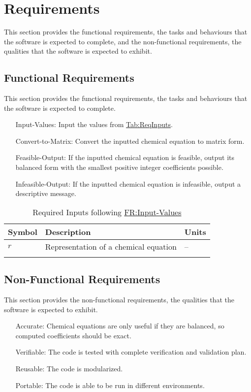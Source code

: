 \documentclass[12pt]{article}
\begin{document}
\section{Requirements}
\label{Sec:Requirements}
This section provides the functional requirements, the tasks and behaviours that the software is expected to complete, and the non-functional requirements, the qualities that the software is expected to exhibit.

\subsection{Functional Requirements}
\label{Sec:FRs}
This section provides the functional requirements, the tasks and behaviours that the software is expected to complete.

\begin{itemize}
\item[Input-Values:\phantomsection\label{inputValues}]{Input the values from \hyperref[Table:ReqInputs]{Tab:ReqInputs}.}
\item[Convert-to-Matrix:\phantomsection\label{convertMatrix}]{Convert the inputted chemical equation to matrix form.}
\item[Feasible-Output:\phantomsection\label{feasOut}]{If the inputted chemical equation is feasible, output its balanced form with the smallest positive integer coefficients possible.}
\item[Infeasible-Output:\phantomsection\label{infeasOut}]{If the inputted chemical equation is infeasible, output a descriptive message.}
\end{itemize}
\begin{longtable}{l l l}
\toprule
\textbf{Symbol} & \textbf{Description} & \textbf{Units}
\\
\midrule
\endhead
$r$ & Representation of a chemical equation & --
\\
\bottomrule
\caption{Required Inputs following \hyperref[inputValues]{FR:Input-Values}}
\label{Table:ReqInputs}
\end{longtable}
\subsection{Non-Functional Requirements}
\label{Sec:NFRs}
This section provides the non-functional requirements, the qualities that the software is expected to exhibit.

\begin{itemize}
\item[Accurate:\phantomsection\label{accurate}]{Chemical equations are only useful if they are balanced, so computed coefficients should be exact.}
\item[Verifiable:\phantomsection\label{verifiable}]{The code is tested with complete verification and validation plan.}
\item[Reusable:\phantomsection\label{reusable}]{The code is modularized.}
\item[Portable:\phantomsection\label{portable}]{The code is able to be run in different environments.}
\end{itemize}
\end{document}
